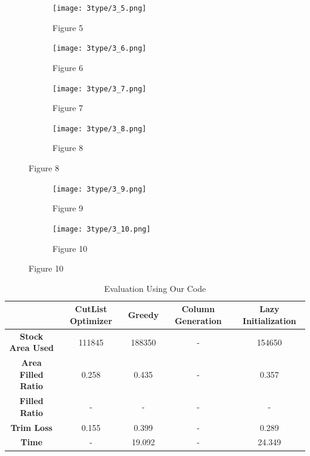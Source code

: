 \documentclass[a4paper]{article}
\begin{document}
\begin{figure}[H] %
  \centering
  \captionsetup{justification=centering, font=small} %
  \begin{subfigure}[b]{0.48\textwidth}
    \centering
    \texttt{[image: 3type/3\_5.png]}
    \caption{Figure 5}
    \label{fig:5}
    \hfill
  \end{subfigure}
  \begin{subfigure}[b]{0.48\textwidth}
    \centering
    \texttt{[image: 3type/3\_6.png]}
    \caption{Figure 6}
    \label{fig:6}
  \end{subfigure}
  
  \vspace{0.1cm}
  
  \begin{subfigure}[b]{0.48\textwidth}
    \centering
    \texttt{[image: 3type/3\_7.png]}
    \caption{Figure 7}
    \label{fig:7}
    \end{subfigure}
    \hfill
  \begin{subfigure}[b]{0.48\textwidth}
    \centering
    \texttt{[image: 3type/3\_8.png]}
    \caption{Figure 8}
    \label{fig:8}
  \end{subfigure}


 
  \label{fig:all_images_part2}
\end{figure}
\begin{figure}[H] %
  \centering
  \captionsetup{justification=centering, font=small} %

  \begin{subfigure}[b]{0.48\textwidth}
    \centering
    \texttt{[image: 3type/3\_9.png]}
    \caption{Figure 9}
    \label{fig:9}
  \end{subfigure}
  \hfill
  \begin{subfigure}[b]{0.48\textwidth}
    \centering
    \texttt{[image: 3type/3\_10.png]}
    \caption{Figure 10}
    \label{fig:10}
  \end{subfigure}
  \label{fig:all_images_part2}
\end{figure}
 \begin{table}[H]
        \centering
        \caption{Evaluation Using Our Code}
        \begin{tabular}{|c|c|c|c|c|}
            \hline
            \textbf{} & \textbf{CutList Optimizer} & \textbf{Greedy} & \textbf{Column Generation} & \textbf{Lazy Initialization} \\ \hline
            \textbf{Stock Area Used} & 111845 & 188350 & - & 154650 \\ \hline
            \textbf{Area Filled Ratio} & 0.258 & 0.435 & - & 0.357 \\ \hline
            \textbf{Filled Ratio} & - & - & - & - \\ \hline
            \textbf{Trim Loss} & 0.155 & 0.399 & - & 0.289 \\ \hline
            \textbf{Time} & - & 19.092 & - & 24.349 \\ \hline
        \end{tabular}
\end{table}
\FloatBarrier
\end{document}
